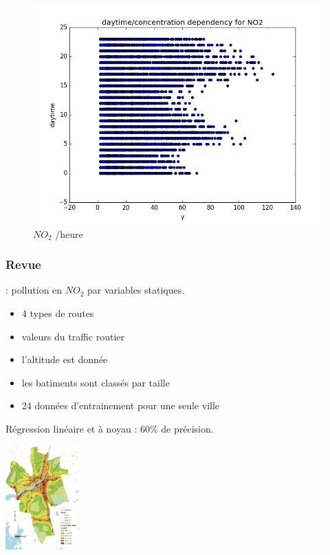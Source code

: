\documentclass{beamer}
\begin{document}
\begin{frame}
\begin{figure}[H]
	\includegraphics[width=\linewidth]{images/NO2_daytime_y.png}
  \caption{$NO_2$ /heure}
	\endminipage\hfill
\end{figure}
\end{frame}

\begin{frame}
\frametitle{Revue}
\cite{NO2reg}: pollution en $NO_2$ par variables statiques.
\begin{itemize}
  \item 4 types de routes
  \item valeurs du traffic routier
  \item l'altitude est donnée
  \item les batiments sont classés par taille
  \item 24 données d'entrainement pour une seule ville
\end{itemize}
Régression linéaire et à noyau : 60\% de précision.
\begin{center}
  \includegraphics[height=4cm]{images/pollution_gothenburg.png}
\end{center}
\end{frame}
\end{document}

